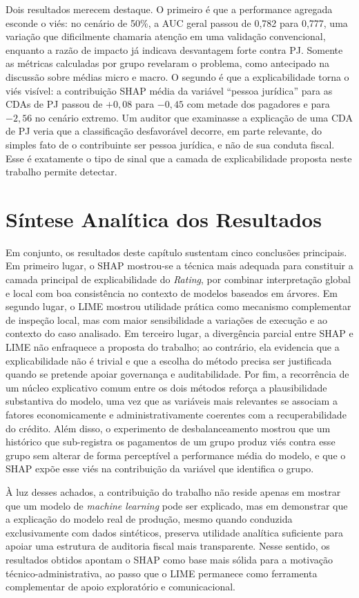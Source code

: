 Dois resultados merecem destaque. O primeiro é que a performance agregada esconde o viés: no cenário de 50\%, a AUC geral passou de 0,782 para 0,777, uma variação que dificilmente chamaria atenção em uma validação convencional, enquanto a razão de impacto já indicava desvantagem forte contra PJ. Somente as métricas calculadas por grupo revelaram o problema, como antecipado na discussão sobre médias micro e macro. O segundo é que a explicabilidade torna o viés visível: a contribuição SHAP média da variável ``pessoa jurídica'' para as CDAs de PJ passou de $+0{,}08$ para $-0{,}45$ com metade dos pagadores e para $-2{,}56$ no cenário extremo. Um auditor que examinasse a explicação de uma CDA de PJ veria que a classificação desfavorável decorre, em parte relevante, do simples fato de o contribuinte ser pessoa jurídica, e não de sua conduta fiscal. Esse é exatamente o tipo de sinal que a camada de explicabilidade proposta neste trabalho permite detectar.



\section{Síntese Analítica dos Resultados}

Em conjunto, os resultados deste capítulo sustentam cinco conclusões principais. Em primeiro lugar, o SHAP mostrou-se a técnica mais adequada para constituir a camada principal de explicabilidade do \textit{Rating}, por combinar interpretação global e local com boa consistência no contexto de modelos baseados em árvores. Em segundo lugar, o LIME mostrou utilidade prática como mecanismo complementar de inspeção local, mas com maior sensibilidade a variações de execução e ao contexto do caso analisado. Em terceiro lugar, a divergência parcial entre SHAP e LIME não enfraquece a proposta do trabalho; ao contrário, ela evidencia que a explicabilidade não é trivial e que a escolha do método precisa ser justificada quando se pretende apoiar governança e auditabilidade. Por fim, a recorrência de um núcleo explicativo comum entre os dois métodos reforça a plausibilidade substantiva do modelo, uma vez que as variáveis mais relevantes se associam a fatores economicamente e administrativamente coerentes com a recuperabilidade do crédito. Além disso, o experimento de desbalanceamento mostrou que um histórico que sub-registra os pagamentos de um grupo produz viés contra esse grupo sem alterar de forma perceptível a performance média do modelo, e que o SHAP expõe esse viés na contribuição da variável que identifica o grupo.

À luz desses achados, a contribuição do trabalho não reside apenas em mostrar que um modelo de \textit{machine learning} pode ser explicado, mas em demonstrar que a explicação do modelo real de produção, mesmo quando conduzida exclusivamente com dados sintéticos, preserva utilidade analítica suficiente para apoiar uma estrutura de auditoria fiscal mais transparente. Nesse sentido, os resultados obtidos apontam o SHAP como base mais sólida para a motivação técnico-administrativa, ao passo que o LIME permanece como ferramenta complementar de apoio exploratório e comunicacional.
